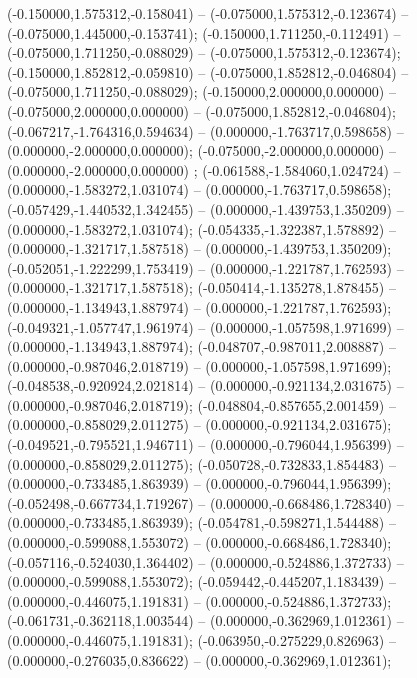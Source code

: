  (-0.150000,1.575312,-0.158041) -- (-0.075000,1.575312,-0.123674) -- (-0.075000,1.445000,-0.153741);
 (-0.150000,1.711250,-0.112491) -- (-0.075000,1.711250,-0.088029) -- (-0.075000,1.575312,-0.123674);
 (-0.150000,1.852812,-0.059810) -- (-0.075000,1.852812,-0.046804) -- (-0.075000,1.711250,-0.088029);
 (-0.150000,2.000000,0.000000) -- (-0.075000,2.000000,0.000000) -- (-0.075000,1.852812,-0.046804);
 (-0.067217,-1.764316,0.594634) -- (0.000000,-1.763717,0.598658) -- (0.000000,-2.000000,0.000000);
 (-0.075000,-2.000000,0.000000) -- (0.000000,-2.000000,0.000000) ;
 (-0.061588,-1.584060,1.024724) -- (0.000000,-1.583272,1.031074) -- (0.000000,-1.763717,0.598658);
 (-0.057429,-1.440532,1.342455) -- (0.000000,-1.439753,1.350209) -- (0.000000,-1.583272,1.031074);
 (-0.054335,-1.322387,1.578892) -- (0.000000,-1.321717,1.587518) -- (0.000000,-1.439753,1.350209);
 (-0.052051,-1.222299,1.753419) -- (0.000000,-1.221787,1.762593) -- (0.000000,-1.321717,1.587518);
 (-0.050414,-1.135278,1.878455) -- (0.000000,-1.134943,1.887974) -- (0.000000,-1.221787,1.762593);
 (-0.049321,-1.057747,1.961974) -- (0.000000,-1.057598,1.971699) -- (0.000000,-1.134943,1.887974);
 (-0.048707,-0.987011,2.008887) -- (0.000000,-0.987046,2.018719) -- (0.000000,-1.057598,1.971699);
 (-0.048538,-0.920924,2.021814) -- (0.000000,-0.921134,2.031675) -- (0.000000,-0.987046,2.018719);
 (-0.048804,-0.857655,2.001459) -- (0.000000,-0.858029,2.011275) -- (0.000000,-0.921134,2.031675);
 (-0.049521,-0.795521,1.946711) -- (0.000000,-0.796044,1.956399) -- (0.000000,-0.858029,2.011275);
 (-0.050728,-0.732833,1.854483) -- (0.000000,-0.733485,1.863939) -- (0.000000,-0.796044,1.956399);
 (-0.052498,-0.667734,1.719267) -- (0.000000,-0.668486,1.728340) -- (0.000000,-0.733485,1.863939);
 (-0.054781,-0.598271,1.544488) -- (0.000000,-0.599088,1.553072) -- (0.000000,-0.668486,1.728340);
 (-0.057116,-0.524030,1.364402) -- (0.000000,-0.524886,1.372733) -- (0.000000,-0.599088,1.553072);
 (-0.059442,-0.445207,1.183439) -- (0.000000,-0.446075,1.191831) -- (0.000000,-0.524886,1.372733);
 (-0.061731,-0.362118,1.003544) -- (0.000000,-0.362969,1.012361) -- (0.000000,-0.446075,1.191831);
 (-0.063950,-0.275229,0.826963) -- (0.000000,-0.276035,0.836622) -- (0.000000,-0.362969,1.012361);
